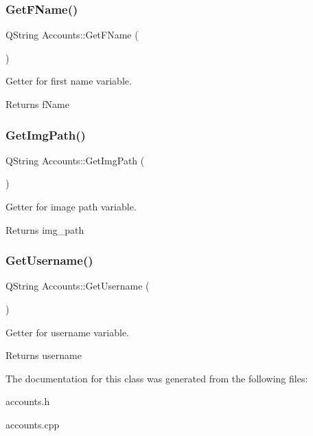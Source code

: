 \subsubsection{\texorpdfstring{Get\+F\+Name()}{GetFName()}}
{\footnotesize\ttfamily Q\+String Accounts\+::\+Get\+F\+Name (\begin{DoxyParamCaption}{ }\end{DoxyParamCaption})}



Getter for first name variable. 

\begin{DoxyReturn}{Returns}
f\+Name 
\end{DoxyReturn}
\mbox{\label{classAccounts_ad9cac5e9a586f525939b120070cbdc2d}} 
\subsubsection{\texorpdfstring{Get\+Img\+Path()}{GetImgPath()}}
{\footnotesize\ttfamily Q\+String Accounts\+::\+Get\+Img\+Path (\begin{DoxyParamCaption}{ }\end{DoxyParamCaption})}



Getter for image path variable. 

\begin{DoxyReturn}{Returns}
img\+\_\+path 
\end{DoxyReturn}
\mbox{\label{classAccounts_aa5d96a34d4281ce65a473b761ad9515a}} 
\subsubsection{\texorpdfstring{Get\+Username()}{GetUsername()}}
{\footnotesize\ttfamily Q\+String Accounts\+::\+Get\+Username (\begin{DoxyParamCaption}{ }\end{DoxyParamCaption})}



Getter for username variable. 

\begin{DoxyReturn}{Returns}
username 
\end{DoxyReturn}


The documentation for this class was generated from the following files\+:\begin{DoxyCompactItemize}
\item 
accounts.\+h\item 
accounts.\+cpp\end{DoxyCompactItemize}
